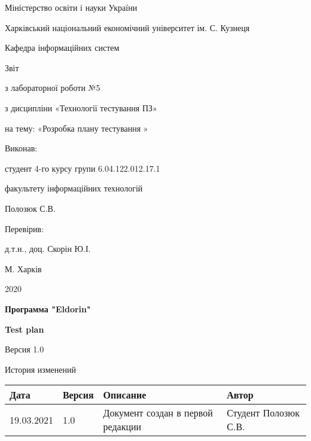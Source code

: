 \documentclass[a4paper,12pt]{article}
\date{}
\newcommand{\El}{Eldorin}
\newcommand{\Authorgod}{Полозюк С.В.}
\begin{document}
	\begin{center}
		Міністерство освіти і науки України

		Харківський національний економічний університет ім. С. Кузнеця

		Кафедра інформаційних систем




		\vspace{4cm}




		Звіт

		з лабораторної роботи №5

		з дисципліни «Технології тестування ПЗ»

		на тему: «Розробка плану тестування
»
		\end{center}
\vspace{4cm}
\begin{flushright}

\begin{minipage}{.45\textwidth}
	Виконав:

	студент 4-го курсу групи 6.04.122.012.17.1

	факультету інформаційних технологій

	Полозюк С.В.

	Перевірив:

	д.т.н., доц. Скорін Ю.І.
\end{minipage}
\end{flushright}
\vspace{8cm}
\begin{center}
М. Харків

2020
\end{center}

\newpage
\textbf{Программа "\El"\\}

\textbf{Test plan}
\vspace{2cm}

Версия 1.0
\vspace{2cm}

История изменений

\begin{center}
	\begin{tabular}{|p{}|p{}|p{}|p{}|}
		\hline
		\rowcolor[gray]{.9} \textbf{Дата} & \textbf{Версия} & \textbf{Описание} & \textbf{Автор} \\
		\hline
		 19.03.2021& 1.0 & Документ создан в первой редакции & Студент \Authorgod \\
		 \hline
	\end{tabular}
\end{center}
\newpage
	\tableofcontents
\newpage
\end{document}
